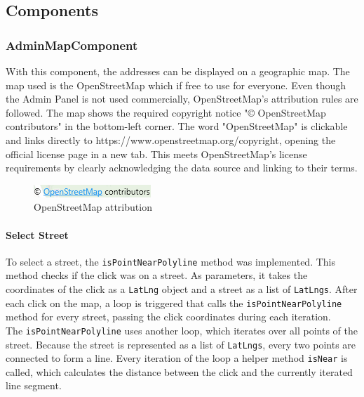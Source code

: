 \subsection{Components}

\subsubsection{AdminMapComponent}
\label{fig:AdminMapComponent}
With this component, the addresses can be displayed on a geographic map. The map used is the OpenStreetMap which if free to use for everyone. Even though the Admin Panel is not used commercially, OpenStreetMap's attribution rules are followed. The map shows the required copyright notice "© OpenStreetMap contributors" in the bottom-left corner. The word "OpenStreetMap" is clickable and links directly to https://www.openstreetmap.org/copyright, opening the official license page in a new tab. This meets OpenStreetMap's license requirements by clearly acknowledging the data source and linking to their terms. \autocite{OpenStreetMap}
\begin{figure}[H]
    \centering
    \includegraphics[width=0.2\linewidth]{images/AdminPanel/Openstreetmapverweis.png}
    \caption{OpenStreetMap attribution}
\end{figure}




\paragraph{Select Street}
\label{fig:Select Street}

To select a street, the \texttt{isPointNearPolyline} method was implemented. This method checks if the click was on a street. As parameters, it takes the coordinates of the click as a \texttt{LatLng} object and a street as a list of \texttt{LatLngs}. After each click on the map, a loop is triggered that calls the \texttt{isPointNearPolyline} method for every street, passing the click coordinates during each iteration.\\

The \texttt{isPointNearPolyline} uses another loop, which iterates over all points of the street. Because the street is represented as a list of \texttt{LatLngs}, every two points are connected to form a line. Every iteration of the loop a helper method \texttt{isNear} is called, which calculates the distance between the click and the currently iterated line segment. 

